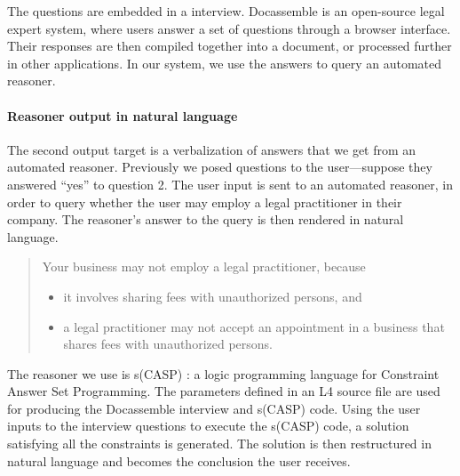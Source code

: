 \documentclass[11pt]{article}
\newcommand{\todoregina}[2][]{\todo[color=red!40,#1]{Regina: #2}}
\def\scasp{s(CASP) }
\begin{document}
The questions are embedded in a \citeauthor{docassemble} interview. Docassemble is an open-source legal expert system, where
users answer a set of questions through a browser interface. Their responses are then compiled together into a document, or processed further in other applications. In our system, we use the answers to query an automated reasoner.



\paragraph{Reasoner output in natural language}
\label{sec:SCASPans}

The second output target is a verbalization of answers that we get from an automated reasoner.
Previously we posed questions to the user---suppose they answered ``yes'' to question 2. The user input is sent to an automated reasoner, in order to query whether the user may employ a legal practitioner in their company. The reasoner's answer to the query is then rendered in natural language.

\begin{quote}
Your business may not employ a legal practitioner, because
\begin{itemize}
\item it involves sharing fees with unauthorized persons, and
\item a legal practitioner may not accept an appointment in a business that shares fees with unauthorized persons.
\end{itemize}
\end{quote}



The reasoner we use is \scasp \cite{arias2018constraint}: a logic programming language for Constraint Answer Set Programming.
The parameters defined in an L4 source file are used for producing the Docassemble interview and \scasp code.
Using the user inputs to the interview questions to execute the \scasp code, a solution satisfying all the constraints is generated. 
The solution is then restructured in natural language and becomes the conclusion the user receives.
\end{document}

